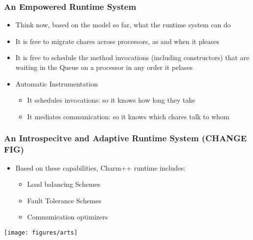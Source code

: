 

\begin{frame}[fragile]
\frametitle{An Empowered Runtime System}

\begin{itemize}
\item Think now, based on the model so far, what the runtime system
  can do
\item It is free to migrate chares across processors, as and when it pleases
\item It is free to schedule the method invocations (including
  constructors) that are waiting in the Queue on a processor in any
  order it pelases
\item Automatic Instrumentation
\begin{itemize}
\item It schedules invocations: so it knows how long they take
\item It mediates communication: so it knows which chares talk to whom
\end{itemize}

\end{itemize}

\end{frame}

\begin{frame}[fragile]
\frametitle{An Introspecitve and Adaptive Runtime System (CHANGE FIG)}
\begin{itemize}
\item Based on these capabilities, Charm++ runtime includes:
\begin{itemize}
\item Load balancing Schemes
\item Fault Tolerance Schemes
\item Communication optimizers
\end{itemize}
\end{itemize}

\texttt{[image: figures/arts]}

\end{frame}


